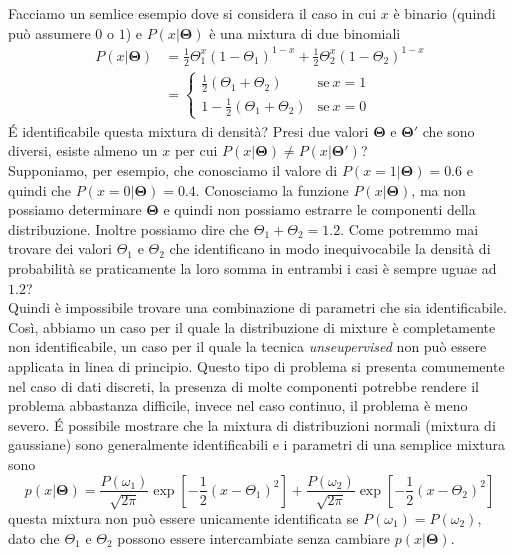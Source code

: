 Facciamo un semlice esempio dove si considera il caso in cui $x$ è binario (quindi può assumere $0$ o $1$) e $P(x|\mathbf{\Theta})$ è una mixtura di due binomiali
\begin{equation}
\begin{split}
P(x|\mathbf{\Theta}) &= \frac{1}{2} \Theta_1^x(1-\Theta_1)^{1-x} + \frac{1}{2}\Theta_2^x(1-\Theta_2)^{1-x}\\
&= \begin{cases}
\frac{1}{2}(\Theta_1 + \Theta_2) & \text{se} \ x =1\\
1 - \frac{1}{2}(\Theta_1 + \Theta_2) & \text{se} \ x = 0 
\end{cases} 
\end{split}
\end{equation}
\'E identificabile questa mixtura di densità? Presi due valori $\mathbf{\Theta}$ e $\mathbf{\Theta}'$ che sono diversi, esiste almeno un $x$ per cui $P(x|\mathbf{\Theta}) \neq P(x|\mathbf{\Theta}')$? \\
Supponiamo, per esempio, che conosciamo il valore di $P(x=1|\mathbf{\Theta}) = 0.6$ e quindi che $P(x=0|\mathbf{\Theta}) = 0.4$. Conosciamo la funzione $P(x|\mathbf{\Theta})$, ma non possiamo determinare $\mathbf{\Theta}$ e quindi non possiamo estrarre le componenti della distribuzione. Inoltre possiamo dire che $\Theta_1 + \Theta_2 = 1.2$. Come potremmo mai trovare dei valori $\Theta_1$ e $\Theta_2$ che identificano in modo inequivocabile la densità di probabilità se praticamente la loro somma in entrambi i casi è sempre uguae ad $1.2$? \\
Quindi è impossibile trovare una combinazione di parametri che sia identificabile.
Così, abbiamo un caso per il quale la distribuzione di mixture è completamente non identificabile, un caso per il quale la tecnica \emph{unseupervised} non può essere applicata in linea di principio. Questo tipo di problema si presenta comunemente nel caso di dati discreti, la presenza di molte componenti potrebbe rendere il problema abbastanza difficile, invece nel caso continuo, il problema è meno severo. \'E possibile mostrare che la mixtura di distribuzioni normali (mixtura di gaussiane) sono generalmente identificabili e i parametri di una semplice mixtura sono
\begin{equation}
p(x|\mathbf{\Theta}) = \frac{P(\omega_1)}{\sqrt{2\pi}} \exp \left[ -\frac{1}{2}(x-\Theta_1)^2 \right] + \frac{P(\omega_2)}{\sqrt{2\pi}} \exp \left[ -\frac{1}{2}(x-\Theta_2)^2 \right] 
\end{equation}
questa mixtura non può essere unicamente identificata se $P(\omega_1) = P(\omega_2)$, dato che $\Theta_1$ e $\Theta_2$ possono essere intercambiate senza cambiare $p(x|\mathbf{\Theta})$.


